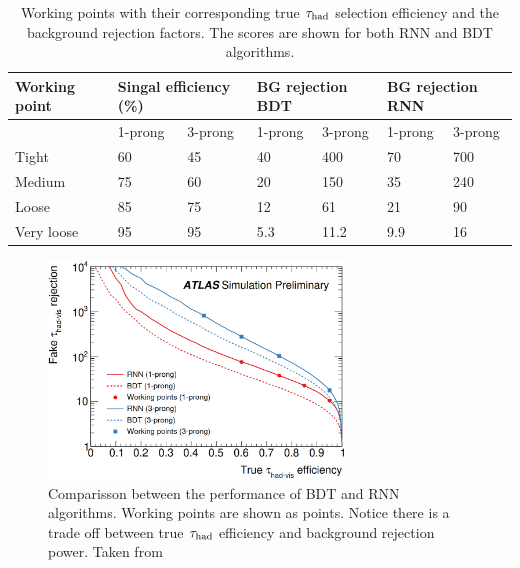 \begin{table}[]
	\begin{tabular}{|l|l|l|l|l|l|l|}
		\hline
		Working point & \multicolumn{2}{l|}{Singal efficiency (\%)} & \multicolumn{2}{l|}{BG rejection BDT} & \multicolumn{2}{l|}{BG rejection RNN} \\ \hline
		& 1-prong              & 3-prong              & 1-prong               & 3-prong               & 1-prong               & 3-prong               \\ \hline
		Tight         & 60                   & 45                   & 40                    & 400                   & 70                    & 700                   \\ \hline
		Medium        & 75                   & 60                   & 20                    & 150                   & 35                    & 240                   \\ \hline
		Loose         & 85                   & 75                   & 12                    & 61                    & 21                    & 90                    \\ \hline
		Very loose    & 95                   & 95                   & 5.3                   & 11.2                  & 9.9                   & 16                    \\ \hline
	\end{tabular}
	\caption{Working points with their corresponding true $\tau_\text{had}$ selection efficiency and the background rejection factors. The scores are shown for both RNN and BDT algorithms.}
	\label{Table2}
\end{table}
\begin{figure}[h]
	\centering
	\includegraphics[width=0.7\textwidth]{figures/Fig5}
	\caption{Comparisson between the performance of BDT and RNN algorithms. Working points are shown as points. Notice there is a trade off between true $\tau_\text{had}$ efficiency and background rejection power. Taken from \cite{Deutsch:2680523}}
	\label{Fig5}
\end{figure}
